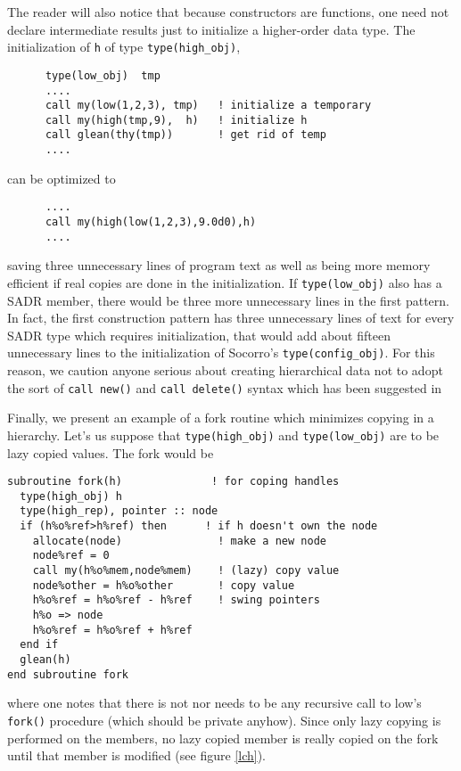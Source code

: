 The reader will also notice that because constructors are
functions, one need not declare intermediate results just to
initialize a higher-order data type.  The initialization of
\verb+h+ of type \verb+type(high_obj)+,
\begin{verbatim}
      type(low_obj)  tmp
      ....
      call my(low(1,2,3), tmp)   ! initialize a temporary
      call my(high(tmp,9),  h)   ! initialize h
      call glean(thy(tmp))       ! get rid of temp
      ....
\end{verbatim}
can be optimized to
\begin{verbatim}
      ....
      call my(high(low(1,2,3),9.0d0),h)
      ....
\end{verbatim}
saving three unnecessary lines of program text as well as being
more memory efficient if real copies are done in the initialization.
If \verb+type(low_obj)+ also has a SADR member, there would be
three more unnecessary lines in the first pattern.
In fact, the first construction pattern has three unnecessary lines of 
text for every SADR type which requires initialization, that
would add about fifteen unnecessary lines to the initialization
of Socorro's \verb+type(config_obj)+.  For this reason,
we caution anyone serious
about creating hierarchical data not to adopt the sort of
\verb+call new()+ and \verb+call delete()+ syntax which has been
suggested in \cite{KimLeeMartin.OORI,DecykNotronSzymanski.OOF90}

Finally, we present an example of a fork routine which minimizes
copying in a hierarchy.  Let's us suppose that \verb+type(high_obj)+
and \verb+type(low_obj)+ are to be lazy copied values.  The fork
would be
\begin{verbatim}
subroutine fork(h)              ! for coping handles
  type(high_obj) h
  type(high_rep), pointer :: node
  if (h%o%ref>h%ref) then      ! if h doesn't own the node
    allocate(node)               ! make a new node
    node%ref = 0
    call my(h%o%mem,node%mem)    ! (lazy) copy value
    node%other = h%o%other       ! copy value
    h%o%ref = h%o%ref - h%ref    ! swing pointers
    h%o => node
    h%o%ref = h%o%ref + h%ref
  end if
  glean(h)
end subroutine fork
\end{verbatim}
where one notes that there is not nor needs to be any recursive call
to low's \verb+fork()+ procedure (which should be private anyhow).
Since only lazy copying is performed on the members, no 
lazy copied member is
really copied on the fork until that member is modified (see figure
\ref{lch}).

